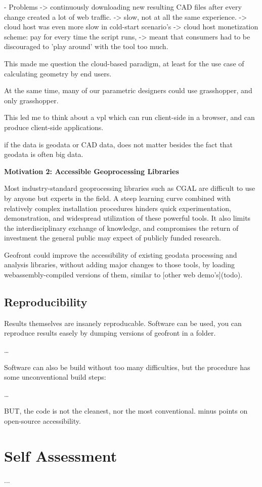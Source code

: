   - Problems
    -> continuously downloading new resulting CAD files after every change created a lot of web traffic. 
    -> slow, not at all the same experience.
    -> cloud host was even more slow in cold-start scenario's   
    -> cloud host monetization scheme: pay for every time the script runs, 
       -> meant that consumers had to be discouraged to 'play around' with the tool too much. 
    
  This made me question the cloud-based paradigm, at least for the use case of calculating geometry by end users. 
  
  At the same time, many of our parametric designers could use grasshopper, and only grasshopper. 
  
  This led me to think about a vpl which can run client-side in a browser, and can produce client-side applications.
  
  if the data is geodata or CAD data, does not matter besides the fact that geodata is often big data.
  
  

  \textbf{Motivation 2: Accessible Geoprocessing Libraries}
  
  Most industry-standard geoprocessing libraries such as CGAL are difficult to use by anyone but experts in the field. A steep learning curve combined with relatively complex installation procedures hinders quick experimentation, demonstration, and widespread utilization of these powerful tools. It also limits the interdisciplinary exchange of knowledge, and compromises the return of investment the general public may expect of publicly funded research.
  
  Geofront could improve the accessibility of existing geodata processing and analysis libraries, without adding major changes to those tools, by loading webassembly-compiled versions of them, similar to [other web demo's](todo).

\subsection{Reproducibility}

Results themselves are insanely reproducable.
Software can be used, you can reproduce results easely by dumping versions of geofront in 
a folder.

\dots

Software can also be build without too many difficulties, but the procedure has some unconventional build steps: 

\dots

BUT, the code is not the cleanest, nor the most conventional. minus points on open-source accessibility.


\section{Self Assessment}

...

